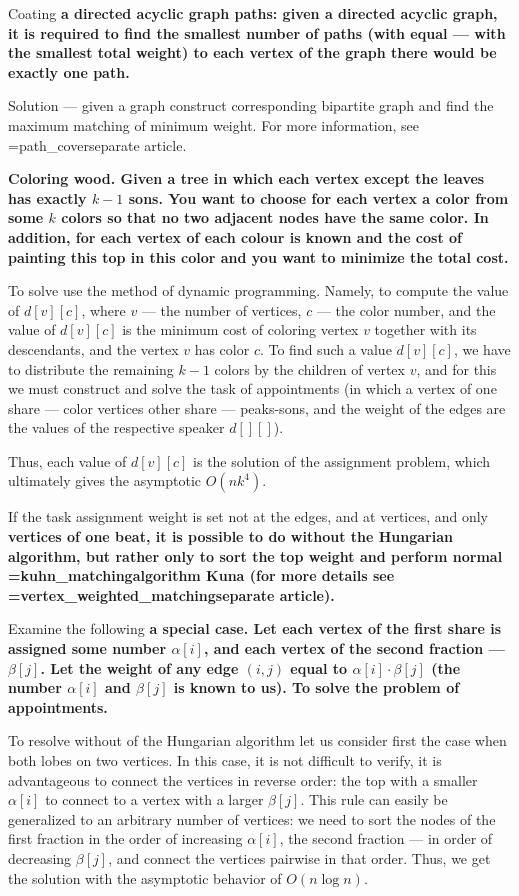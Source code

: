{\li Coating \bf{a directed acyclic graph paths}: given a directed acyclic graph, it is required to find the smallest number of paths (with equal --- with the smallest total weight) to each vertex of the graph there would be exactly one path.

Solution --- given a graph construct corresponding bipartite graph and find the maximum matching of minimum weight. For more information, see \algohref=path_cover{separate article}.

\li \bf{Coloring wood}. Given a tree in which each vertex except the leaves has exactly $k-1$ sons. You want to choose for each vertex a color from some $k$ colors so that no two adjacent nodes have the same color. In addition, for each vertex of each colour is known and the cost of painting this top in this color and you want to minimize the total cost.

To solve use the method of dynamic programming. Namely, to compute the value of $d[v][c]$, where $v$ --- the number of vertices, $c$ --- the color number, and the value of $d[v][c]$ is the minimum cost of coloring vertex $v$ together with its descendants, and the vertex $v$ has color $c$. To find such a value $d[v][c]$, we have to distribute the remaining $k-1$ colors by the children of vertex $v$, and for this we must construct and solve the task of appointments (in which a vertex of one share --- color vertices other share --- peaks-sons, and the weight of the edges are the values of the respective speaker $d[][]$).

Thus, each value of $d[v][c]$ is the solution of the assignment problem, which ultimately gives the asymptotic $O(n k^4)$.

\li If the task assignment weight is set not at the edges, and at vertices, and only \bf{vertices of one beat}, it is possible to do without the Hungarian algorithm, but rather only to sort the top weight and perform normal \algohref=kuhn_matching{algorithm Kuna} (for more details see \algohref=vertex_weighted_matching{separate article}).

\li Examine the following \bf{a special case}. Let each vertex of the first share is assigned some number $\alpha[i]$, and each vertex of the second fraction --- $\beta[j]$. Let the weight of any edge $(i,j)$ equal to $\alpha[i] \cdot \beta[j]$ (the number $\alpha[i]$ and $\beta[j]$ is known to us). To solve the problem of appointments.

To resolve without of the Hungarian algorithm let us consider first the case when both lobes on two vertices. In this case, it is not difficult to verify, it is advantageous to connect the vertices in reverse order: the top with a smaller $\alpha[i]$ to connect to a vertex with a larger $\beta[j]$. This rule can easily be generalized to an arbitrary number of vertices: we need to sort the nodes of the first fraction in the order of increasing $\alpha[i]$, the second fraction --- in order of decreasing $\beta[j]$, and connect the vertices pairwise in that order. Thus, we get the solution with the asymptotic behavior of $O (n \log n)$.

}
